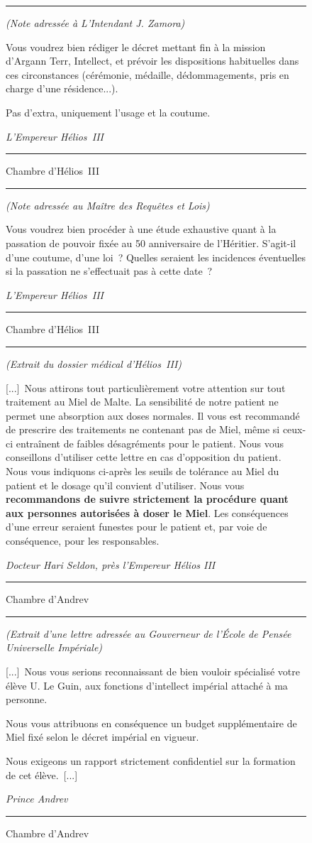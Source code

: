 \documentclass{article}
\newcommand{\newcharacter}{\clearpage\setcounter{figure}{0}}
\newcommand{\indice}[4]{
  \begin{figure}[H]
    \begin{center}
      \rule{0.5\textwidth}{1pt}
    \end{center}
    \begin{framed}
      \begin{samepage}
        \textit{#1}
        \nopagebreak

        #2

        \nopagebreak

        \hfill\textit{#3}
      \end{samepage}
    \end{framed}
    \caption{#4}
    \begin{center}
      \rule{0.5\textwidth}{1pt}
    \end{center}
  \end{figure}
}
\begin{document}
\indice
{(Note adressée à L'Intendant J. Zamora)}
{Vous voudrez bien rédiger le décret mettant fin à la mission d'Argann Terr,
Intellect, et prévoir les dispositions habituelles dans ces circonstances
(cérémonie, médaille, dédommagements, pris en charge d'une résidence...).

\nobreak

Pas d'extra, uniquement l'usage et la coutume.}
{L'Empereur Hélios~III}
{Chambre d'Hélios~III}

\indice
{(Note adressée au Maître des Requêtes et Lois)}
{Vous voudrez bien procéder à une étude exhaustive quant à la passation de
pouvoir fixée au 50\ieme{} anniversaire de l'Héritier. S'agit-il d'une coutume,
d'une loi~? Quelles seraient les incidences éventuelles si la passation
ne s'effectuait pas à cette date~?}
{L'Empereur Hélios~III}
{Chambre d'Hélios~III}

\newcharacter

\indice
{(Extrait du dossier médical d'Hélios~III)}
{[...]~Nous attirons tout particulièrement votre attention sur tout traitement
au Miel de Malte. La sensibilité de notre patient ne permet une absorption aux
doses normales. Il vous est recommandé de prescrire des traitements ne
contenant pas de Miel, même si ceux-ci entraînent de faibles désagréments pour
le patient. Nous vous conseillons d'utiliser cette lettre en cas d'opposition
du patient. Nous vous indiquons ci-après les seuils de tolérance au Miel du
patient et le dosage qu'il convient d'utiliser. Nous vous \textbf{recommandons
de suivre strictement la procédure quant aux personnes autorisées à doser le
Miel}. Les conséquences d'une erreur seraient funestes pour le patient et, par
voie de conséquence, pour les responsables.}
{Docteur Hari Seldon, près l'Empereur Hélios III}
{Chambre d'Andrev}

\indice
{(Extrait d'une lettre adressée au Gouverneur de l'École de Pensée Universelle
Impériale)}
{[...]~Nous vous serions reconnaissant de bien vouloir spécialisé votre élève
U. Le Guin, aux fonctions d'intellect impérial attaché à ma personne.

\nobreak

Nous vous attribuons en conséquence un budget supplémentaire de Miel fixé selon
le décret impérial en vigueur.

\nobreak

Nous exigeons un rapport strictement confidentiel sur la formation de cet
élève.~[...]}
{Prince Andrev}
{Chambre d'Andrev}
\end{document}
